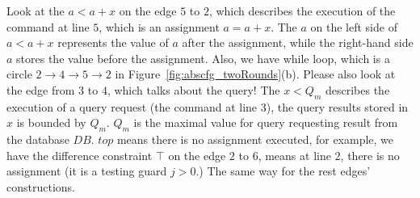 Look at the $a < a+x $ on the edge $5$ to $2$, which describes the execution of the command at line $5$, which is an assignment $a = a+x$. The $a$ on the left side of $a < a+x$ represents the value of $a$ after the assignment, while the right-hand side $a$ stores the value before the assignment. 
Also, we have while loop, which is a circle $2 \to 4 \to 5 \to 2$ in Figure~\ref{fig:abscfg_twoRounds}(b). 
Please also look at the edge from $3$ to $4$, which talks about the query! The $x < Q_m$ describes the execution of a query request (the command at line 3), the query results stored in $x$ is bounded by $Q_m$. 
$Q_m$ is the maximal value for query requesting result from the database $DB$. $top$ means there is no assignment executed, for example, we have the difference constraint $\top$ on the edge $2$ to $6$, means at line $2$, there is no assignment (it is a testing guard $j>0$.) 
%
The same way for the rest edges' constructions.

%
\subsection{}
\label{sec:alg_rbgen}
%




